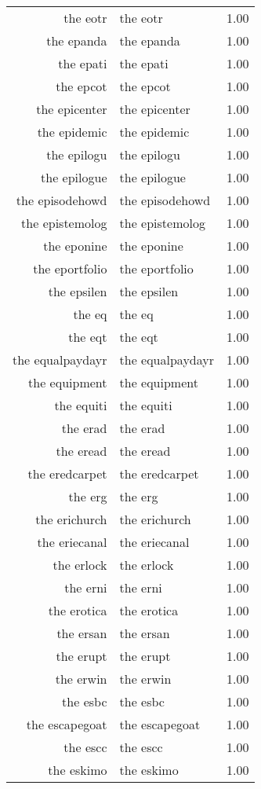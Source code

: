 \begin{table}[ht]
\begin{tabular}{rlr}
  the eotr & the eotr & 1.00 \\ 
  the epanda & the epanda & 1.00 \\ 
  the epati & the epati & 1.00 \\ 
  the epcot & the epcot & 1.00 \\ 
  the epicenter & the epicenter & 1.00 \\ 
  the epidemic & the epidemic & 1.00 \\ 
  the epilogu & the epilogu & 1.00 \\ 
  the epilogue & the epilogue & 1.00 \\ 
  the episodehowd & the episodehowd & 1.00 \\ 
  the epistemolog & the epistemolog & 1.00 \\ 
  the eponine & the eponine & 1.00 \\ 
  the eportfolio & the eportfolio & 1.00 \\ 
  the epsilen & the epsilen & 1.00 \\ 
  the eq & the eq & 1.00 \\ 
  the eqt & the eqt & 1.00 \\ 
  the equalpaydayr & the equalpaydayr & 1.00 \\ 
  the equipment & the equipment & 1.00 \\ 
  the equiti & the equiti & 1.00 \\ 
  the erad & the erad & 1.00 \\ 
  the eread & the eread & 1.00 \\ 
  the eredcarpet & the eredcarpet & 1.00 \\ 
  the erg & the erg & 1.00 \\ 
  the erichurch & the erichurch & 1.00 \\ 
  the eriecanal & the eriecanal & 1.00 \\ 
  the erlock & the erlock & 1.00 \\ 
  the erni & the erni & 1.00 \\ 
  the erotica & the erotica & 1.00 \\ 
  the ersan & the ersan & 1.00 \\ 
  the erupt & the erupt & 1.00 \\ 
  the erwin & the erwin & 1.00 \\ 
  the esbc & the esbc & 1.00 \\ 
  the escapegoat & the escapegoat & 1.00 \\ 
  the escc & the escc & 1.00 \\ 
  the eskimo & the eskimo & 1.00 \\ 

\end{tabular}
\end{table}
